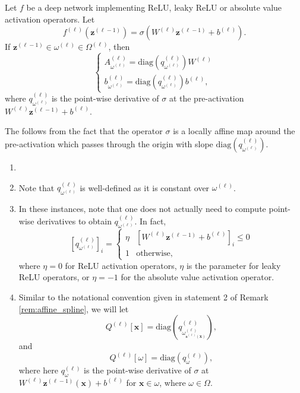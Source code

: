 \begin{proposition}\label{prop:characterising_region_maps_relu_deep_networks}
    Let $f$ be a deep network implementing ReLU, leaky ReLU or absolute value activation operators. Let $$f^{(\ell)}\left(\mathbf{z}^{(\ell-1)}\right)=\sigma\left(W^{(\ell)}\mathbf{z}^{(\ell-1)}+b^{(\ell)}\right).$$If $\mathbf{z}^{(\ell-1)}\in\omega^{(\ell)}\in\Omega^{(\ell)}$, then $$\begin{cases}A_{\omega^{(\ell)}}^{(\ell)}=\mathrm{diag}\left(q_{\omega^{(\ell)}}^{(\ell)}\right)W^{(\ell)}\\b_{\omega^{(\ell)}}^{(\ell)}=\mathrm{diag}\left(q_{\omega^{(\ell)}}^{(\ell)}\right)b^{(\ell)},\end{cases}$$where $q_{\omega^{(\ell)}}^{(\ell)}$ is the point-wise derivative of $\sigma$ at the pre-activation $W^{(\ell)}\mathbf{z}^{(\ell-1)}+b^{(\ell)}$.
\end{proposition}

\begin{tproof}
    The follows from the fact that the operator $\sigma$ is a locally affine map around the pre-activation which passes through the origin with slope $\mathrm{diag}\left(q_{\omega^{(\ell)}}^{(\ell)}\right)$.
\end{tproof}

\begin{remark}\label{rem:characterising_region_maps_relu_deep_networks}
    \begin{enumerate}
        \item[]
        \item Note that $q_{\omega^{(\ell)}}^{(\ell)}$ is well-defined as it is constant over $\omega^{(\ell)}$.
        \item In these instances, note that one does not actually need to compute point-wise derivatives to obtain $q_{\omega^{(\ell)}}^{(\ell)}$. In fact, $$\left[q_{\omega^{(\ell)}}^{(\ell)}\right]_i=\begin{cases}\eta&\left[W^{(\ell)}\mathbf{z}^{(\ell-1)}+b^{(\ell)}\right]_i\leq0\\1&\text{otherwise},\end{cases}$$where $\eta=0$ for ReLU activation operators, $\eta$ is the parameter for leaky ReLU operators, or $\eta=-1$ for the absolute value activation operator.
        \item Similar to the notational convention given in statement 2 of Remark \ref{rem:affine_spline}, we will let $$Q^{(\ell)}[\mathbf{x}]=\mathrm{diag}\left(q^{(\ell)}_{\omega^{(\ell)}_{\mathbf{s}^{(\ell)}(\mathbf{x})}}\right),$$and$$Q^{(\ell)}[\omega]=\mathrm{diag}\left(q^{(\ell)}_{\omega}\right),$$where here $q^{(\ell)}_{\omega}$ is the point-wise derivative of $\sigma$ at $W^{(\ell)}\mathbf{z}^{(\ell-1)}(\mathbf{x})+b^{(\ell)}$ for $\mathbf{x}\in\omega$, where $\omega\in\Omega$. 
    \end{enumerate}
\end{remark}

